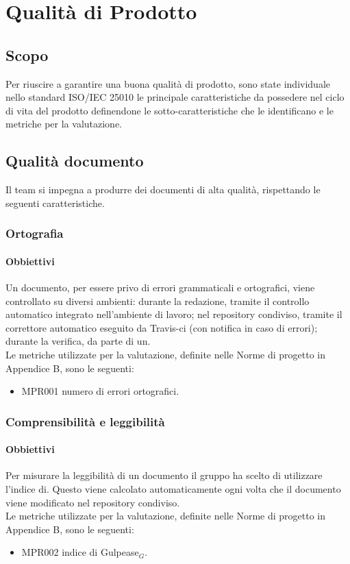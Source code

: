 \chapter{Qualità di Prodotto}
\label{prodotto}
\section{Scopo}
Per riuscire a garantire una buona qualità di prodotto, sono state individuale nello standard ISO/IEC 25010 le principale caratteristiche da possedere nel ciclo di vita del prodotto definendone le sotto-caratteristiche che le identificano e le metriche per la valutazione.

\section{Qualità documento}
\label{documento}
Il team si impegna a produrre dei documenti di alta qualità, rispettando le seguenti caratteristiche.
\subsection{Ortografia}
\subsubsection{Obbiettivi}
Un documento, per essere privo di errori grammaticali e ortografici, viene controllato su diversi ambienti: durante la redazione, tramite il controllo automatico integrato nell'ambiente di lavoro; nel repository condiviso, tramite il correttore automatico eseguito da Travis-ci (con notifica in caso di errori); durante la verifica, da parte di un.\\
Le metriche utilizzate per la valutazione, definite nelle Norme di progetto in Appendice B, sono le seguenti:
\begin{itemize}
    \item MPR001 numero di errori ortografici.
\end{itemize}
\subsection{Comprensibilità e leggibilità}
\subsubsection{Obbiettivi}
Per misurare la leggibilità di un documento il gruppo ha scelto di utilizzare l'indice di. Questo viene calcolato automaticamente ogni volta che il documento viene modificato nel repository condiviso.\\
Le metriche utilizzate per la valutazione, definite nelle Norme di progetto in Appendice B, sono le seguenti:
\begin{itemize}
    \item MPR002 indice di Gulpease$_{G}$.
\end{itemize}
